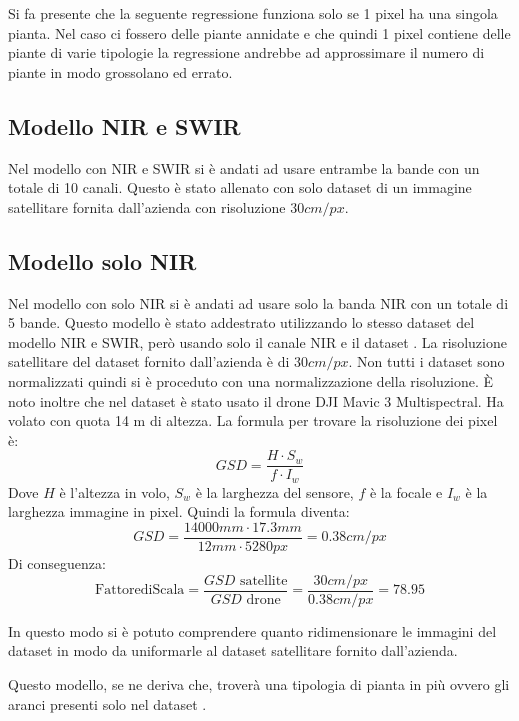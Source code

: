 Si fa presente che la seguente regressione funziona solo se 1 pixel ha una singola pianta. 
Nel caso ci fossero delle piante annidate e che quindi 1 pixel contiene delle piante di varie tipologie la regressione 
andrebbe ad approssimare il numero di piante in modo grossolano ed errato.

\subsection{Modello NIR e SWIR}
Nel modello con NIR e SWIR si è andati ad usare entrambe la bande con un totale di 10 canali.
Questo è stato allenato con solo dataset di un immagine satellitare fornita dall'azienda con risoluzione $30cm/px$.
\subsection{Modello solo NIR}
Nel modello con solo NIR si è andati ad usare solo la banda NIR con un totale di 5 bande.
Questo modello è stato addestrato utilizzando lo stesso dataset del modello NIR e SWIR, però usando solo il canale NIR e il dataset \cite{guillem_montalban_faet_2025_17866344}.
La risoluzione satellitare del dataset fornito dall'azienda è di $30cm/px$. 
Non tutti i dataset sono normalizzati quindi si è proceduto con una normalizzazione della risoluzione.
È noto inoltre che nel dataset \cite{guillem_montalban_faet_2025_17866344} è stato usato il drone DJI Mavic 3 Multispectral. Ha volato con quota 14 m di altezza. 
La formula per trovare la risoluzione dei pixel è:
\[
GSD=\frac{H \cdot S_w}{f \cdot I_w}
\]
Dove $H$ è l'altezza in volo, $S_w$ è la larghezza del sensore, $f$ è la focale e $I_w$ è la larghezza immagine in pixel. Quindi la formula diventa:
\[
GSD=\frac{14000mm \cdot 17.3mm}{ 12mm \cdot 5280 px}=0.38 cm/px
\]
Di conseguenza:
\[ 
\text{FattorediScala}=\frac{GSD\text{ satellite}}{GSD\text{ drone}}=\frac{30cm/px}{0.38cm/px}=78.95
\]

In questo modo si è potuto comprendere quanto ridimensionare le immagini del dataset \cite{guillem_montalban_faet_2025_17866344} 
in modo da uniformarle al dataset satellitare fornito dall'azienda.

Questo modello, se ne deriva che, troverà una tipologia di pianta in più ovvero gli aranci presenti solo nel dataset \cite{guillem_montalban_faet_2025_17866344}.